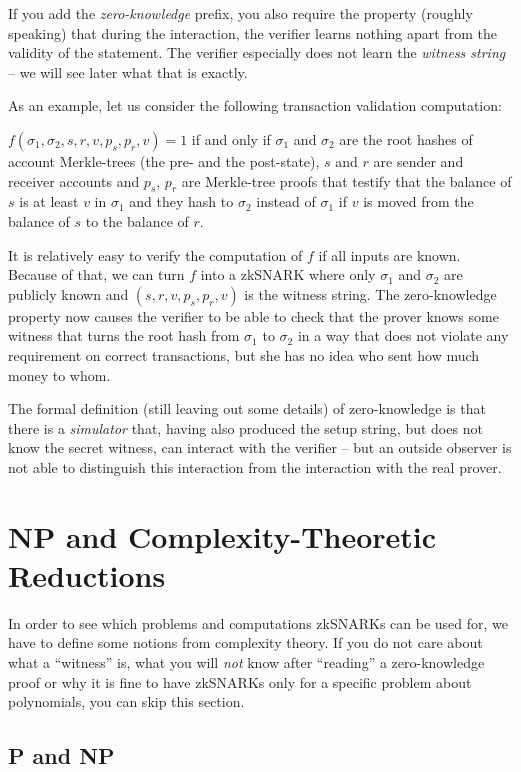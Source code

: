 \documentclass[11pt,letterpaper]{article}
\begin{document}
If you add the \textit{zero-knowledge} prefix, you also require the property (roughly speaking) that during the interaction, the verifier learns nothing apart from the validity of the statement. The verifier especially does not learn the \textit{witness string} -- we will see later what that is exactly.

As an example, let us consider the following transaction validation computation:

$f(\sigma_{1}, \sigma_{2}, s, r, v, p_{s}, p_{r}, v) = 1$ if and only if $\sigma_{1}$ and $\sigma_{2}$ are the root hashes of account Merkle-trees (the pre- and the post-state), $s$ and $r$ are sender and receiver accounts and $p_{s}$, $p_{r}$ are Merkle-tree proofs that testify that the balance of $s$ is at least $v$ in $\sigma_{1}$ and they hash to $\sigma_{2}$ instead of $\sigma_{1}$ if $v$ is moved from the balance of $s$ to the balance of $r$.

It is relatively easy to verify the computation of $f$ if all inputs are known. Because of that, we can turn $f$ into a zkSNARK where only $\sigma_{1}$ and $\sigma_{2}$ are publicly known and $(s, r, v, p_{s}, p_{r}, v)$ is the witness string. The zero-knowledge property now causes the verifier to be able to check that the prover knows some witness that turns the root hash from $\sigma_{1}$ to $\sigma_{2}$ in a way that does not violate any requirement on correct transactions, but she has no idea who sent how much money to whom.


The formal definition (still leaving out some details) of zero-knowledge is that there is a \textit{simulator} that, having also produced the setup string, but does not know the secret witness, can interact with the verifier -- but an outside observer is not able to distinguish this interaction from the interaction with the real prover.

\section{NP and Complexity-Theoretic Reductions}


In order to see which problems and computations zkSNARKs can be used for, we have to define some notions from complexity theory. If you do not care about what a ``witness'' is, what you will \textit{not} know after ``reading'' a zero-knowledge proof or why it is fine to have zkSNARKs only for a specific problem about polynomials, you can skip this section.

\subsection{P and NP}
\end{document}
